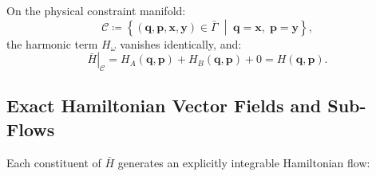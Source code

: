 \documentclass[11pt,a4paper,reqno]{article}
\theoremstyle{plain}
\theoremstyle{definition}
\theoremstyle{remark}
\numberwithin{equation}{section}
\begin{document}
On the physical constraint manifold:
\begin{equation}
\mathcal{C} \coloneqq \left\{ (\bm{q}, \bm{p}, \bm{x}, \bm{y}) \in \bar{\Gamma} \;\middle|\; \bm{q} = \bm{x}, \; \bm{p} = \bm{y} \right\},
\label{eq:constraint_manifold}
\end{equation}
the harmonic term $H_\omega$ vanishes identically, and:
\begin{equation}
\left. \bar{H} \right|_{\mathcal{C}} = H_A(\bm{q}, \bm{p}) + H_B(\bm{q}, \bm{p}) + 0 = H(\bm{q}, \bm{p}).
\end{equation}

\subsection{Exact Hamiltonian Vector Fields and Sub-Flows}
Each constituent of $\bar{H}$ generates an explicitly integrable Hamiltonian flow:
\end{document}
